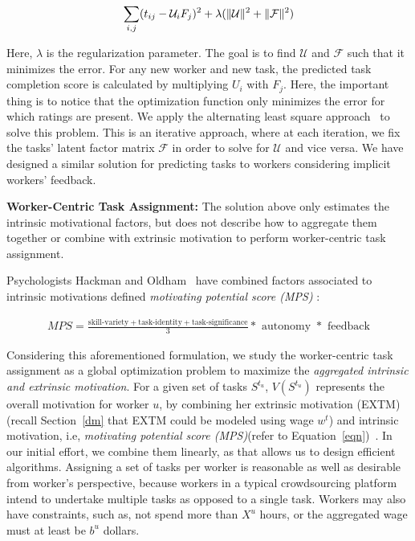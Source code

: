 \begin{equation}
\sum_{i,j}(t_{ij}-\mathcal{U}_iF_j)^2+\lambda(\|\mathcal{U}\|^2+ \|\mathcal{F}\|^2)
\vspace{-0.1in}
\end{equation}

Here, $\lambda$ is the regularization parameter. The goal is to find ${\mathcal U}$ and ${\mathcal F}$ such that it minimizes the error. For any new worker and new task, the predicted task completion score is calculated by multiplying $U_i$ with $F_j$. Here, the important thing is to notice that the optimization function only minimizes the error for which ratings are present.  We apply the alternating least square approach~\cite{stigler1981gauss} to solve this problem. This is an iterative approach, where at each iteration, we fix the tasks' latent factor matrix $\mathcal{F}$ in order to solve for $\mathcal{U}$ and vice versa. We have designed a similar solution for predicting tasks to workers considering implicit workers' feedback\cite{DBLP:journals/corr/RahmanJR16}.

 
{\bf Worker-Centric Task Assignment:} The solution above only estimates the intrinsic motivational factors, but does not describe how to aggregate them together or combine with extrinsic motivation to perform worker-centric task assignment. 

Psychologists Hackman and Oldham~\cite{hackman1976motivation} have combined factors associated to intrinsic motivations defined {\em motivating potential score (MPS)} :

\begin{equation}\label{eqn}
\begin{aligned}
MPS= \frac{\text{skill-variety} + \text{task-identity} + \text{task-significance}}{3}  
 *\text{ autonomy } * \text{ feedback}
\end{aligned}
\end{equation}

Considering this aforementioned formulation, we study the worker-centric task assignment as a global optimization problem to maximize the {\em aggregated intrinsic and extrinsic motivation}. For a given set of tasks $S^{t_u}$,  $V(S^{t_u})$ represents the overall motivation for worker $u$, by combining  her extrinsic motivation  (EXTM) (recall Section~\ref{dm} that EXTM could be modeled using wage $w^t$) and intrinsic motivation, i.e, {\em motivating potential score (MPS)}(refer to Equation~\ref{eqn})~\cite{hackman1976motivation}. In our initial effort, we combine them linearly, as that allows us to design efficient algorithms. Assigning a set of tasks per worker is reasonable as well as desirable from worker's perspective, because workers in a typical crowdsourcing platform intend to undertake multiple tasks as opposed to a single task. Workers may also have constraints, such as,  not spend more than $X^u$ hours, 
or the aggregated wage must at least be $b^u$ dollars. 
 
